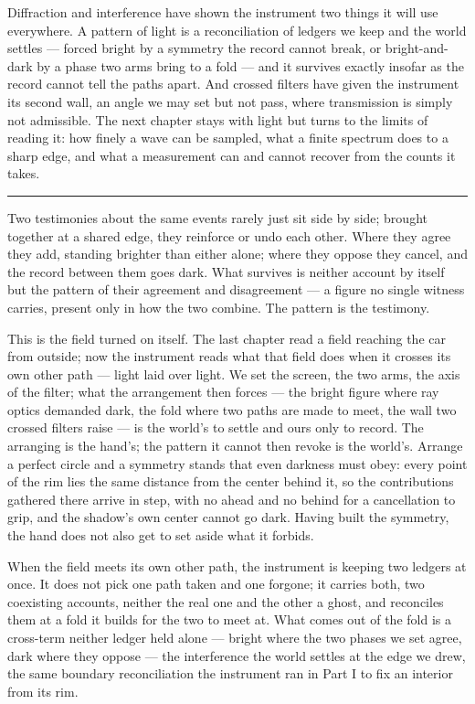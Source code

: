 \bigskip

Diffraction and interference have shown the instrument two things it will use everywhere. A pattern of light
is a reconciliation of ledgers we keep and the world settles --- forced bright by a symmetry the record cannot
break, or bright-and-dark by a phase two arms bring to a fold --- and it survives exactly insofar as the
record cannot tell the paths apart. And crossed filters have given the instrument its second wall, an angle we
may set but not pass, where transmission is simply not admissible. The next chapter stays with light but turns
to the limits of reading it: how finely a wave can be sampled, what a finite spectrum does to a sharp edge,
and what a measurement can and cannot recover from the counts it takes.

\bigskip
\begin{center}
\rule{0.4\textwidth}{0.4pt}
\end{center}
\bigskip

\noindent Two testimonies about the same events rarely just sit side by side; brought together at a shared
edge, they reinforce or undo each other. Where they agree they add, standing brighter than either alone; where
they oppose they cancel, and the record between them goes dark. What survives is neither account by itself but
the pattern of their agreement and disagreement --- a figure no single witness carries, present only in how the
two combine. The pattern is the testimony.

This is the field turned on itself. The last chapter read a field reaching the car from outside; now the
instrument reads what that field does when it crosses its own other path --- light laid over light. We set the
screen, the two arms, the axis of the filter; what the arrangement then forces --- the bright figure where ray
optics demanded dark, the fold where two paths are made to meet, the wall two crossed filters raise --- is the
world's to settle and ours only to record. The arranging is the hand's; the pattern it cannot then revoke is
the world's. Arrange a perfect circle and a symmetry stands that even darkness must obey: every point of the
rim lies the same distance from the center behind it, so the contributions gathered there arrive in step, with
no ahead and no behind for a cancellation to grip, and the shadow's own center cannot go dark. Having built the
symmetry, the hand does not also get to set aside what it forbids.

When the field meets its own other path, the instrument is keeping two ledgers at once. It does not pick one
path taken and one forgone; it carries both, two coexisting accounts, neither the real one and the other a
ghost, and reconciles them at a fold it builds for the two to meet at. What comes out of the fold is a
cross-term neither ledger held alone --- bright where the two phases we set agree, dark where they oppose ---
the interference the world settles at the edge we drew, the same boundary reconciliation the instrument ran in
Part I to fix an interior from its rim.

